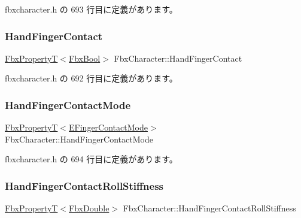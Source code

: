  fbxcharacter.\+h の 693 行目に定義があります。

\mbox{\label{class_fbx_character_aba418b90928e70e76a2d5892e134c702}} 
\subsubsection{\texorpdfstring{Hand\+Finger\+Contact}{HandFingerContact}}
{\footnotesize\ttfamily \hyperlink{class_fbx_property_t}{Fbx\+PropertyT}$<$\hyperlink{fbxtypes_8h_a92e0562b2fe33e76a242f498b362262e}{Fbx\+Bool}$>$ Fbx\+Character\+::\+Hand\+Finger\+Contact}



 fbxcharacter.\+h の 692 行目に定義があります。

\mbox{\label{class_fbx_character_a83c7da8980616b8a44c635c70878c182}} 
\subsubsection{\texorpdfstring{Hand\+Finger\+Contact\+Mode}{HandFingerContactMode}}
{\footnotesize\ttfamily \hyperlink{class_fbx_property_t}{Fbx\+PropertyT}$<$\hyperlink{class_fbx_character_a97bd5ed3c7b4a63bf46ef111e7dc0f0a}{E\+Finger\+Contact\+Mode}$>$ Fbx\+Character\+::\+Hand\+Finger\+Contact\+Mode}



 fbxcharacter.\+h の 694 行目に定義があります。

\mbox{\label{class_fbx_character_ad7d6f16d141ad3e5adbb5670e55299c1}} 
\subsubsection{\texorpdfstring{Hand\+Finger\+Contact\+Roll\+Stiffness}{HandFingerContactRollStiffness}}
{\footnotesize\ttfamily \hyperlink{class_fbx_property_t}{Fbx\+PropertyT}$<$\hyperlink{fbxtypes_8h_a171e72a1c46fc15c1a6c9c31948c1c5b}{Fbx\+Double}$>$ Fbx\+Character\+::\+Hand\+Finger\+Contact\+Roll\+Stiffness}



